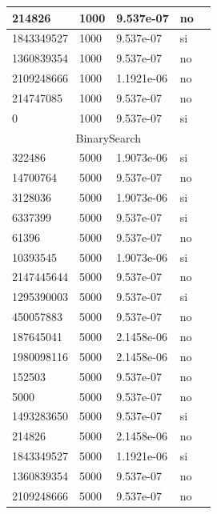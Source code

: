 \documentclass[12pt, fleqn]{article}                             %
\theoremstyle{break}                                            %
\begin{document}
\begin{longtable}{|m{5em}|m{5em}|m{10em}|m{5em}|@{}m{0pt}@{}}
            214826& 1000  & 9.537e-07 & no &\\[1em]    \hline
            1843349527& 1000  & 9.537e-07 & si &\\[1em]    \hline
            1360839354& 1000  & 9.537e-07 & no &\\[1em]    \hline
            2109248666& 1000  & 1.1921e-06 & no &\\[1em]    \hline
            214747085& 1000  & 9.537e-07 & no &\\[1em]    \hline
            0& 1000  & 9.537e-07 & si &\\[1em]    \hline
            \multicolumn{5}{|c|}{BinarySearch}   \\          \hline
            322486& 5000  & 1.9073e-06 & si &\\[1em]    \hline
            14700764& 5000  & 9.537e-07 & no &\\[1em]    \hline
            3128036& 5000  & 1.9073e-06 & si &\\[1em]    \hline
            6337399& 5000  & 9.537e-07 & si &\\[1em]    \hline
            61396& 5000  & 9.537e-07 & no &\\[1em]    \hline
            10393545& 5000  & 1.9073e-06 & si &\\[1em]    \hline
            2147445644& 5000  & 9.537e-07 & no &\\[1em]    \hline
            1295390003& 5000  & 9.537e-07 & si &\\[1em]    \hline
            450057883& 5000  & 9.537e-07 & no &\\[1em]    \hline
            187645041& 5000  & 2.1458e-06 & no &\\[1em]    \hline
            1980098116& 5000  & 2.1458e-06 & no &\\[1em]    \hline
            152503& 5000  & 9.537e-07 & no &\\[1em]    \hline
            5000& 5000  & 9.537e-07 & no &\\[1em]    \hline
            1493283650& 5000  & 9.537e-07 & si &\\[1em]    \hline
            214826& 5000  & 2.1458e-06 & no &\\[1em]    \hline
            1843349527& 5000  & 1.1921e-06 & si &\\[1em]    \hline
            1360839354& 5000  & 9.537e-07 & no &\\[1em]    \hline
            2109248666& 5000  & 9.537e-07 & no &\\[1em]    \hline

\end{longtable}
\end{document}
